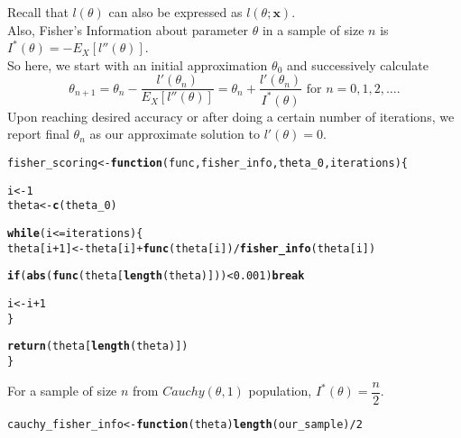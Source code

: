 \documentclass[11pt, a4paper]{article}\usepackage[]{graphicx}\usepackage[]{xcolor}
\makeatletter
\newcommand{\hlnum}[1]{\textcolor[rgb]{0.686,0.059,0.569}{#1}}%
\newcommand{\hlopt}[1]{\textcolor[rgb]{0,0,0}{#1}}%
\newcommand{\hldef}[1]{\textcolor[rgb]{0.345,0.345,0.345}{#1}}%
\newcommand{\hlkwa}[1]{\textcolor[rgb]{0.161,0.373,0.58}{\textbf{#1}}}%
\newcommand{\hlkwb}[1]{\textcolor[rgb]{0.69,0.353,0.396}{#1}}%
\newcommand{\hlkwc}[1]{\textcolor[rgb]{0.333,0.667,0.333}{#1}}%
\newcommand{\hlkwd}[1]{\textcolor[rgb]{0.737,0.353,0.396}{\textbf{#1}}}%
\newenvironment{kframe}{%
 \def\at@end@of@kframe{}%
 \ifinner\ifhmode%
  \def\at@end@of@kframe{\end{minipage}}%
  \begin{minipage}{\columnwidth}%
 \fi\fi%
 \def\FrameCommand##1{\hskip\@totalleftmargin \hskip-\fboxsep
 \colorbox{shadecolor}{##1}\hskip-\fboxsep
     \hskip-\linewidth \hskip-\@totalleftmargin \hskip\columnwidth}%
 \MakeFramed {\advance\hsize-\width
   \@totalleftmargin\z@ \linewidth\hsize
   \@setminipage}}%
 {\par\unskip\endMakeFramed%
 \at@end@of@kframe}
\newenvironment{knitrout}{}{} %
\makeatother
\begin{document}
Recall that $l(\theta)$ can also be expressed as $l(\theta; \mathbf{x})$. \\

Also, Fisher's Information about parameter $\theta$ in a sample of size $n$ is $I^{\ast} (\theta) = - E_X[l''(\theta)]$. \\

So here, we start with an initial approximation $\theta_0$ and successively calculate $$\theta_{n+1} = \theta_n - \dfrac{l'(\theta_n)}{E_X[l''(\theta)]} = \theta_n + \dfrac{l'(\theta_n)}{I^{\ast} (\theta)} \,\, \text{for} \,\, n = 0, 1, 2, \ldots.$$ Upon reaching desired accuracy or after doing a certain number of iterations, we report final $\theta_n$ as our approximate solution to $l'(\theta) = 0$. \\

\begin{knitrout}
\color{fgcolor}\begin{kframe}
\begin{alltt}
\hldef{fisher_scoring} \hlkwb{<-} \hlkwa{function}\hldef{(}\hlkwc{func}\hldef{,} \hlkwc{fisher_info} \hldef{,} \hlkwc{theta_0}\hldef{,} \hlkwc{iterations}\hldef{)\{}

  \hldef{i} \hlkwb{<-} \hlnum{1}
  \hldef{theta} \hlkwb{<-} \hlkwd{c}\hldef{(theta_0)}

  \hlkwa{while}\hldef{(i} \hlopt{<=} \hldef{iterations)\{}
    \hldef{theta[i}\hlopt{+}\hlnum{1}\hldef{]} \hlkwb{<-} \hldef{theta[i]} \hlopt{+} \hlkwd{func}\hldef{(theta[i])} \hlopt{/} \hlkwd{fisher_info}\hldef{(theta[i])}

    \hlkwa{if}\hldef{(}\hlkwd{abs}\hldef{(}\hlkwd{func}\hldef{(theta[}\hlkwd{length}\hldef{(theta)]))} \hlopt{<} \hlnum{0.001}\hldef{)} \hlkwa{break}

    \hldef{i} \hlkwb{<-} \hldef{i} \hlopt{+} \hlnum{1}
  \hldef{\}}

  \hlkwd{return}\hldef{(theta[}\hlkwd{length}\hldef{(theta)])}
\hldef{\}}
\end{alltt}
\end{kframe}
\end{knitrout}

\newpage

For a sample of size $n$ from $Cauchy(\theta, 1)$ population, $I^{\ast}(\theta) = \dfrac{n}{2}$.

\begin{knitrout}
\color{fgcolor}\begin{kframe}
\begin{alltt}
\hldef{cauchy_fisher_info} \hlkwb{<-} \hlkwa{function}\hldef{(}\hlkwc{theta}\hldef{)} \hlkwd{length}\hldef{(our_sample)} \hlopt{/} \hlnum{2}
\end{alltt}
\end{kframe}
\end{knitrout}
\end{document}
